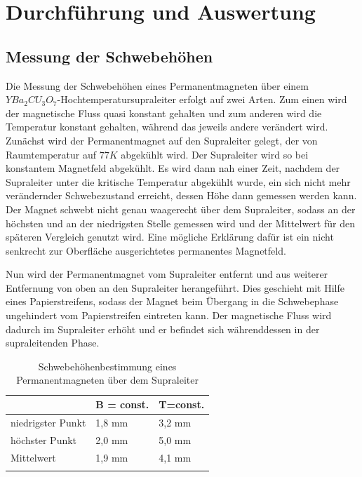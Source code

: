 \section{Durchführung und Auswertung}

\subsection{Messung der Schwebehöhen}

Die Messung der Schwebehöhen eines Permanentmagneten über einem $YBa_2CU_3O_7$-Hochtemperatursupraleiter erfolgt auf zwei Arten. Zum einen wird der magnetische Fluss quasi konstant gehalten und zum anderen wird die Temperatur konstant gehalten, während das jeweils andere verändert wird.
Zunächst wird der Permanentmagnet auf den Supraleiter gelegt, der von Raumtemperatur auf $77K$ abgekühlt wird. Der Supraleiter wird so bei konstantem Magnetfeld abgekühlt. Es wird dann nah einer Zeit, nachdem der Supraleiter unter die kritische Temperatur abgekühlt wurde, ein sich nicht mehr verändernder Schwebezustand erreicht, dessen Höhe dann gemessen werden kann. Der Magnet schwebt nicht genau waagerecht über dem Supraleiter, sodass an der höchsten und an der niedrigsten Stelle gemessen wird und der Mittelwert für den späteren Vergleich genutzt wird. Eine mögliche Erklärung dafür ist ein nicht senkrecht zur Oberfläche ausgerichtetes permanentes Magnetfeld.

Nun wird der Permanentmagnet vom Supraleiter entfernt und aus weiterer Entfernung von oben an den Supraleiter herangeführt. Dies geschieht mit Hilfe eines Papierstreifens, sodass der Magnet beim Übergang in die Schwebephase ungehindert vom Papierstreifen eintreten kann. Der magnetische Fluss wird dadurch im Supraleiter erhöht und er befindet sich währenddessen in der supraleitenden Phase.

\begin{table}[h]
\caption{Schwebehöhenbestimmung eines Permanentmagneten über dem Supraleiter}
\begin{tabular}[h]{|l|l|l|}
\hline
 & B = const. &  T=const. \\
\hline
niedrigster Punkt & 1,8 mm & 3,2 mm \\
höchster Punkt & 2,0 mm & 5,0 mm \\
Mittelwert & 1,9 mm & 4,1 mm \\ \hline
\label{schwebe}
\end{tabular}
\end{table}

